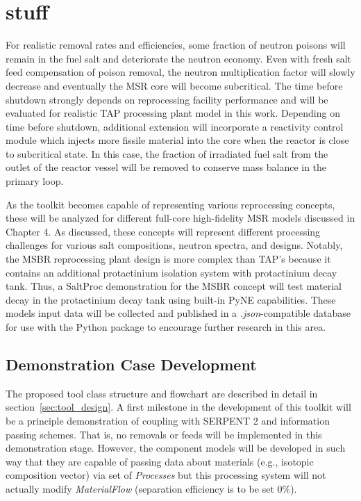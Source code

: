 \section{stuff}
For realistic removal rates and efficiencies, some fraction of neutron poisons 
will remain in the fuel salt and deteriorate the neutron economy. Even with 
fresh salt feed compensation of poison removal, the neutron multiplication 
factor will slowly decrease and eventually the \gls{MSR} core will become 
subcritical. The time before 
shutdown strongly depends on reprocessing facility performance 
and will be evaluated for realistic \gls{TAP} processing plant model 
in this work. Depending on time before shutdown, additional 
extension will 
incorporate a reactivity control module which injects more fissile 
material into the core when the reactor is close to subcritical state. 
In this case, the fraction of irradiated fuel salt from the outlet of 
the reactor vessel will be removed to conserve mass balance in the 
primary loop.

As the toolkit becomes capable of representing various reprocessing 
concepts, these will be analyzed for different full-core 
high-fidelity \gls{MSR} models discussed in Chapter 4. As discussed, 
these concepts will represent different processing challenges 
for various salt compositions, neutron spectra, and designs. 
Notably, the \gls{MSBR} reprocessing plant design is more complex 
than \gls{TAP}'s because it contains an additional protactinium 
isolation system with protactinium decay tank. Thus, a SaltProc 
demonstration for the \gls{MSBR} concept will test material decay 
in the protactinium decay tank using built-in PyNE capabilities. 
These models input data will be collected and 
published in a \textit{.json}-compatible database for use with the 
Python package to encourage further research in this area.



\subsection{Demonstration Case Development}
The proposed tool class structure and flowchart are 
described in detail in section~\ref{sec:tool_design}.
A first milestone in the development of this toolkit will be a 
principle demonstration of coupling with SERPENT 2 and 
information passing schemes. That is, no removals or feeds 
will be implemented in this demonstration stage. However, 
the component models will be developed in such way that 
they are capable of passing data about materials (e.g., isotopic 
composition vector) via set of \textit{Processes} but this 
processing system will not actually modify \textit{MaterialFlow} 
(separation efficiency is to be set 0\%).

